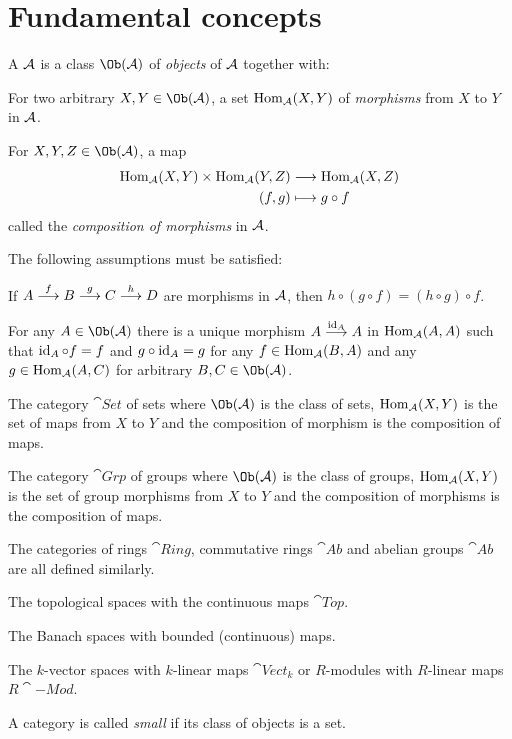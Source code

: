 \documentclass[a4paper,parskip=half,numbers=enddot, DIV=12]{scrreprt}
\begin{document}
\section{Fundamental concepts}
\begin{defi}[Category]
	A  $\mathcal{A}$ is a class $\Ob(\Aa)$ of \emph{objects} of $\mathcal{A}$ together with:
	\begin{alphanumerate}
	    \item 
	        For two arbitrary $X,Y\in \Ob(\Aa)$, a set $\operatorname{Hom}_{\mathcal{A}}(X,Y)$ of \emph{morphisms} from $X$ to $Y$ in $\mathcal{A}$.
	    \item 
	        For $X,Y,Z\in\Ob(\Aa)$, a map 
	        \begin{align*}
	            \operatorname{Hom}_{\mathcal{A}}(X,Y)\times \operatorname{Hom}_{\mathcal{A}}(Y,Z) &\longrightarrow \operatorname{Hom}_{\mathcal{A}}(X,Z)\\
	            (f,g) &\longmapsto g\circ f
	        \end{align*}
	        called the \emph{composition of morphisms} in $\mathcal{A}$.
	\end{alphanumerate}
	The following assumptions must be satisfied:
	\begin{rmnumerate}
	    \item
	        If $A\morphism[f] B \morphism[g] C\morphism[h] D$ are morphisms in $\mathcal{A}$, then $h\circ(g\circ f) = (h\circ g)\circ f$.
	    \item
	        For any $A\in\Ob(\Aa)$ there is a unique morphism $A\morphism[\id_A] A$ in $\operatorname{Hom}_{\mathcal{A}}(A,A)$ such that $\operatorname{id}_A \circ f = f$ and $g\circ \operatorname{id}_A = g$ for any $f\in \operatorname{Hom}_{\mathcal{A}}(B,A)$ and any $g\in \operatorname{Hom}_{\mathcal{A}}(A,C)$ for arbitrary $B,C\in \Ob(\Aa)$.
	\end{rmnumerate}
\end{defi}
\begin{example}
    \begin{alphanumerate}
        \item 
            The category $\cat{Set}$ of sets where $\Ob(\Aa)$ is the class of sets, $\operatorname{Hom}_{\mathcal{A}}(X,Y)$ is the set of maps from $X$ to $Y$ and the composition of morphism is the composition of maps.
        \item 
            The category $\cat{Grp}$ of groups where $\Ob(\Aa)$ is the class of groups, $\operatorname{Hom}_{\mathcal{A}}(X,Y)$ is the set of group morphisms from $X$ to $Y$ and the composition of morphisms is the composition of maps.
        \item 
            The categories of rings $\cat{Ring}$, commutative rings $\cat{Ab}$ and abelian groups $\cat{Ab}$ are all defined similarly.
        \item 
            The topological spaces with the continuous maps $\cat{Top}$.
        \item 
            The Banach spaces with bounded (continuous) maps.
        \item 
            The $k$-vector spaces with $k$-linear maps $\cat{Vect}_k$ or $R$-modules with $R$-linear maps $R\cat{-Mod}$.
    \end{alphanumerate}
\end{example}
A category is called \emph{small} if its class of objects is a set.
\end{document}
